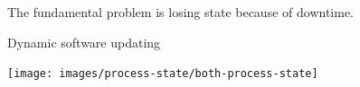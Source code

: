 \begin{frame}{}%
\begin{block}{}
\begin{center}
{\LARGE
The fundamental problem is losing state because of downtime.
}
\vspace{0.5ex}
\end{center}
\end{block}
\end{frame}

\begin{frame}{Dynamic software updating}%
\vspace*{-3mm}%
\begin{center}%
\texttt{[image: images/process-state/both-process-state]}%
\end{center}%
\end{frame}


